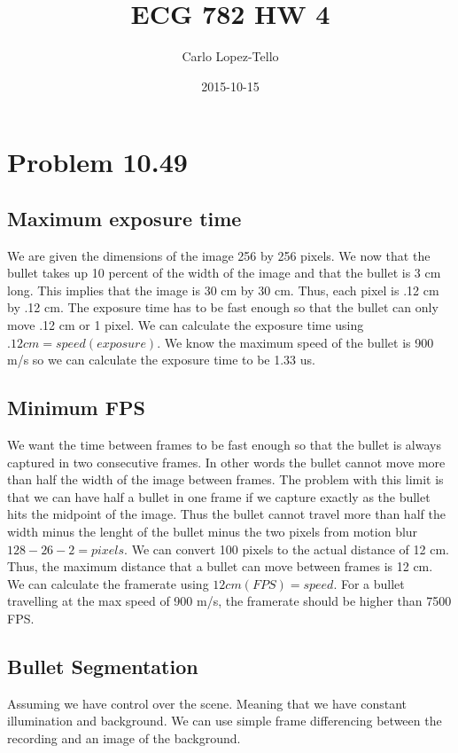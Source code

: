 \documentclass{article}
\title{ECG 782 HW 4}
\date{2015-10-15}
\author{Carlo Lopez-Tello}
\begin{document}
\maketitle
	\newpage
	\section{Problem 10.49}
	
	\subsection{Maximum exposure time}
	We are given the dimensions of the image 256 by 256 pixels. We now that the bullet takes up 10 percent of the width of the image and that the bullet is 3 cm long. This implies that the image is 30 cm by 30 cm. Thus, each pixel is .12 cm by .12 cm. The exposure time has to be fast enough so that the bullet can only move .12 cm or 1 pixel. We can calculate the exposure time using \(.12 cm = speed(exposure)\). We know the maximum speed of the bullet is 900 m/s so we can calculate the exposure time to be 1.33 us.
	
	\subsection{Minimum FPS}
	We want the time between frames to be fast enough so that the bullet is always captured in two consecutive frames. In other words the bullet cannot move more than half the width of the image between frames. The problem with this limit is that we can have half a bullet in one frame if we capture exactly as the bullet hits the midpoint of the image. Thus the bullet cannot travel more than half the width minus the lenght of the bullet minus the two pixels from motion blur \(128 - 26 - 2 = pixels\). We can convert 100 pixels to the actual distance of 12 cm. Thus, the maximum distance that a bullet can move between frames is 12 cm. We can calculate the framerate using \(12 cm(FPS) = speed\). For a bullet travelling at the max speed of 900 m/s, the framerate should be higher than 7500 FPS.
	
	\subsection{Bullet Segmentation}
	Assuming we have control over the scene. Meaning that we have constant illumination and background. We can use simple frame differencing between the recording and an image of the background.
	
\end{document}

